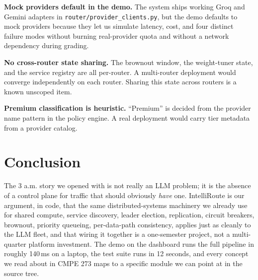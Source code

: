 \documentclass[conference,letterpaper]{IEEEtran}
\begin{document}
\textbf{Mock providers default in the demo.} The system ships
working Groq and Gemini adapters in
\texttt{router/provider\_clients.py}, but the demo defaults to mock
providers because they let us simulate latency, cost, and four
distinct failure modes without burning real-provider quota and
without a network dependency during grading.

\textbf{No cross-router state sharing.} The brownout window, the
weight-tuner state, and the service registry are all per-router. A
multi-router deployment would converge independently on each router.
Sharing this state across routers is a known unscoped item.

\textbf{Premium classification is heuristic.} ``Premium'' is decided
from the provider name pattern in the policy engine. A real
deployment would carry tier metadata from a provider catalog.

\section{Conclusion}
The 3 a.m. story we opened with is not really an LLM problem; it is
the absence of a control plane for traffic that should obviously
\emph{have} one. IntelliRoute is our argument, in code, that the same
distributed-systems machinery we already use for shared compute,
service discovery, leader election, replication, circuit breakers,
brownout, priority queueing, per-data-path consistency, applies
just as cleanly to the LLM fleet, and that wiring it together is a
one-semester project, not a multi-quarter platform investment. The
demo on the dashboard runs the full pipeline in roughly 140\,ms on a
laptop, the test suite runs in 12 seconds, and every concept we read
about in CMPE 273 maps to a specific module we can point at in the
source tree.
\end{document}
